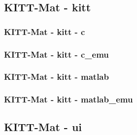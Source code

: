 \documentclass{report}
\begin{document}
\label{lst:defs-sensormode.m}

\label{lst:defs-snapdata.m}

\subsection{KITT-Mat - kitt}
\label{appsubsec:kitt-mat-kitt}
\label{lst:kitt-kitt-serial.m}

\label{lst:kitt-kitt-status.m}

\subsubsection{KITT-Mat - kitt - c}
\label{appsubsubsec:kitt-mat-kitt-c}
\label{lst:c-kitt-serial.m}

\subsubsection{KITT-Mat - kitt - c\_emu}
\label{appsubsubsec:kitt-mat-kitt-c-emu}
\label{lst:c-emu-kitt-serial.m}

\subsubsection{KITT-Mat - kitt - matlab}
\label{appsubsubsec:kitt-mat-kitt-matlab}
\label{lst:matlab-kitt-serial.m}

\subsubsection{KITT-Mat - kitt - matlab\_emu}
\label{appsubsubsec:kitt-mat-kitt-matlab-emu}
\label{lst:matlab-emu-kitt-serial.m}

\subsection{KITT-Mat - ui}
\label{appsubsec:kitt-mat-ui}
\label{lst:ui-add-line-point.m}
\end{document}
